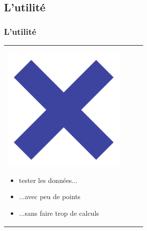 \documentclass[handout]{beamer}
\begin{document}
	\subsection{L'utilité}
		\begin{frame}
		\frametitle{L'utilité}
		\begin{tabular}{l l}
			\begin{minipage}{0.2\textwidth}
				\begin{center}
					\includegraphics[width=0.9\textwidth]{images/cross.png}
				\end{center}
			\end{minipage}

			\begin{minipage}{0.8\textwidth}
				\begin{itemize}
					\item tester les données...
					\item ...avec peu de points
					\item ...sans faire trop de calculs
				\end{itemize}
			\end{minipage}

		\end{tabular}
		\end{frame}
\end{document}
